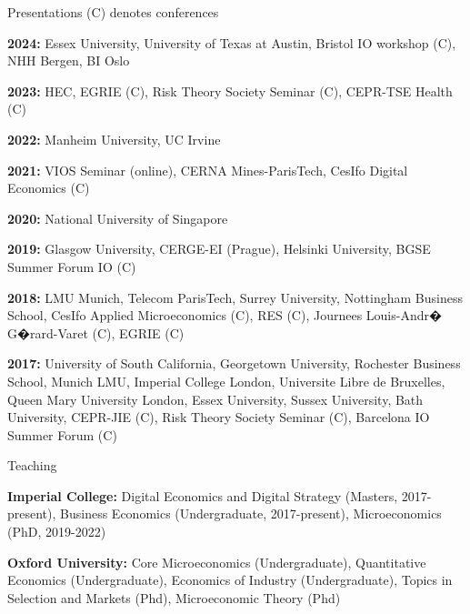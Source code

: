 \documentclass{resume}
\begin{document}
\begin{rSection}{Presentations \tiny{(C) denotes conferences}}

\textbf{2024:} Essex University, University of Texas at Austin, Bristol IO workshop (C), NHH Bergen, BI Oslo

\textbf{2023:} HEC, EGRIE (C), Risk Theory Society Seminar (C), CEPR-TSE Health (C)

\textbf{2022:} Manheim University, UC Irvine

\textbf{2021:} VIOS Seminar (online), CERNA Mines-ParisTech, CesIfo Digital Economics (C)

\textbf{2020:} National University of Singapore

\textbf{2019:} Glasgow University, CERGE-EI (Prague), Helsinki University, BGSE Summer Forum IO (C)

\textbf{2018:} LMU Munich, Telecom ParisTech, Surrey University, Nottingham Business School, CesIfo Applied Microeconomics (C), RES (C), Journees Louis-Andr� G�rard-Varet (C), EGRIE (C)

\textbf{2017:} University of South California, Georgetown University, Rochester Business School, Munich LMU, Imperial College London, Universite Libre de Bruxelles, Queen Mary University London, Essex University, Sussex University, Bath University, CEPR-JIE (C), Risk Theory Society Seminar (C), Barcelona IO Summer Forum (C) 

\end{rSection}


\begin{rSection}{Teaching}

\textbf{Imperial College:} Digital Economics and Digital Strategy (Masters, 2017-present), Business Economics (Undergraduate, 2017-present), Microeconomics (PhD, 2019-2022)

\textbf{Oxford University:} Core Microeconomics (Undergraduate), Quantitative Economics (Undergraduate), Economics of Industry (Undergraduate), Topics in Selection and Markets (Phd), Microeconomic Theory (Phd)

\end{rSection}




\end{document}
